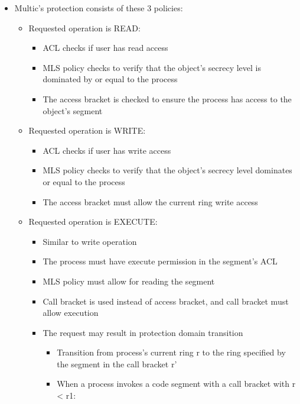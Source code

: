 \documentclass[
  12pt]{findlay}
\providecommand{\tightlist}{%
  \setlength{\itemsep}{0pt}\setlength{\parskip}{0pt}}
\begin{document}
\begin{itemize}
\tightlist
\item
  Multic's protection consists of these 3 policies:

  \begin{itemize}
  \tightlist
  \item
    Requested operation is READ:

    \begin{itemize}
    \tightlist
    \item
      ACL checks if user has read access
    \item
      MLS policy checks to verify that the object's secrecy level is
      dominated by or equal to the process
    \item
      The access bracket is checked to ensure the process has access to
      the object's segment
    \end{itemize}
  \item
    Requested operation is WRITE:

    \begin{itemize}
    \tightlist
    \item
      ACL checks if user has write access
    \item
      MLS policy checks to verify that the object's secrecy level
      dominates or equal to the process
    \item
      The access bracket must allow the current ring write access
    \end{itemize}
  \item
    Requested operation is EXECUTE:

    \begin{itemize}
    \tightlist
    \item
      Similar to write operation
    \item
      The process must have execute permission in the segment's ACL
    \item
      MLS policy must allow for reading the segment
    \item
      Call bracket is used instead of access bracket, and call bracket
      must allow execution
    \item
      The request may result in protection domain transition

      \begin{itemize}
      \tightlist
      \item
        Transition from process's current ring r to the ring specified
        by the segment in the call bracket r'
      \item
        When a process invokes a code segment with a call bracket with r
        \textless{} r1:


\end{itemize}
\end{itemize}
\end{itemize}
\end{itemize}
\end{document}
